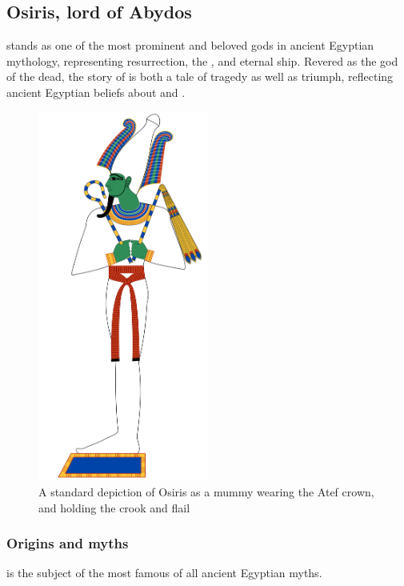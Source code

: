 \subsection*{Osiris, lord of Abydos}

 stands as one of the most prominent and beloved gods in ancient Egyptian mythology, representing resurrection, the , and eternal ship. Revered as the god of the dead, the story of  is both a tale of tragedy as well as triumph, reflecting ancient Egyptian beliefs about  and .

\begin{figure} [H]
	\centering
	\includegraphics[width=0.5\textwidth]{../images/osiris}
	\caption{A standard depiction of Osiris as a mummy wearing the Atef crown, and holding the crook and flail}
\end{figure}

\subsubsection*{Origins and myths}

 is the subject of the most famous of all ancient Egyptian myths.

